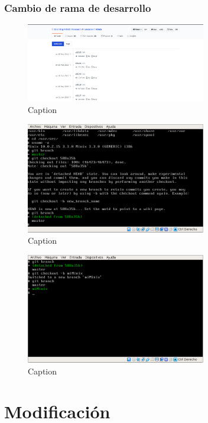 \documentclass[12pt]{scrartcl}
\begin{document}
\subsubsection{Cambio de rama de desarrollo}
\begin{figure}[H]
  \centering
  \includegraphics[width=0.7\textwidth]{1.png}
  \caption{Caption}
\end{figure}
\begin{figure}[H]
  \centering
  \includegraphics[width=0.7\textwidth]{2.png}
  \caption{Caption}
\end{figure}
\begin{figure}[H]
  \centering
  \includegraphics[width=0.7\textwidth]{3.png}
  \caption{Caption}
\end{figure}

\section{Modificación}
\end{document}
